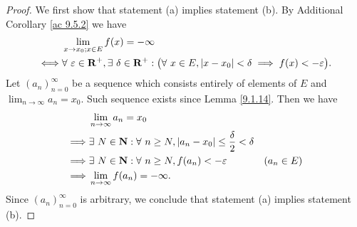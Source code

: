 \begin{proof}
    We first show that statement (a) implies statement (b).
    By Additional Corollary \ref{ac 9.5.2} we have
    \begin{align*}
             & \lim_{x \to x_0 ; x \in E} f(x) = -\infty                                                                                                                   \\
        \iff & \forall\ \varepsilon \in \mathbf{R}^+, \exists\ \delta \in \mathbf{R}^+ : \big(\forall\ x \in E, \abs*{x - x_0} < \delta \implies f(x) < -\varepsilon\big).
    \end{align*}
    Let \((a_n)_{n = 0}^\infty\) be a sequence which consists entirely of elements of \(E\) and \(\lim_{n \to \infty} a_n = x_0\).
    Such sequence exists since Lemma \ref{9.1.14}.
    Then we have
    \begin{align*}
                 & \lim_{n \to \infty} a_n = x_0                                                                                \\
        \implies & \exists\ N \in \mathbf{N} : \forall\ n \geq N, \abs*{a_n - x_0} \leq \frac{\delta}{2} < \delta               \\
        \implies & \exists\ N \in \mathbf{N} : \forall\ n \geq N, f(a_n) < -\varepsilon                           & (a_n \in E) \\
        \implies & \lim_{n \to \infty} f(a_n) = -\infty.
    \end{align*}
    Since \((a_n)_{n = 0}^\infty\) is arbitrary, we conclude that statement (a) implies statement (b).


\end{proof}
